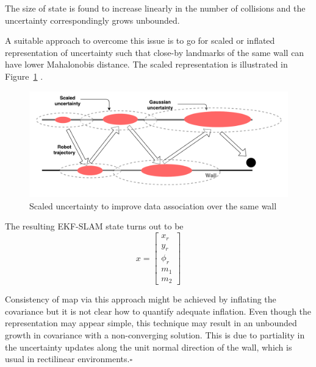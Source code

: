 \begin{exmp}
The size of state is found to increase linearly in the number of collisions and the uncertainty correspondingly grows unbounded. 

A suitable approach to overcome this issue is to go for scaled or inflated representation of uncertainty \cite{julier2003stability} such that close-by landmarks of the same wall can have lower Mahalonobis distance. The scaled representation is illustrated in Figure~\ref{ex1_scalepointlandmark} .
\begin{figure}
\centering
\includegraphics[scale=0.5]{./images/ex1_scalepointlandmark}
\caption[Scaled representation of point landmarks]{Scaled uncertainty to improve data association over the same wall}
\label{ex1_scalepointlandmark}
\end{figure}  

The resulting EKF-SLAM state turns out to be
\begin{equation}
x=\begin{bmatrix}x_r \\ y_r \\ \phi_r \\ m_1 \\ m_2 \end{bmatrix}
\label{eq_state}
\end{equation}

Consistency of map via this approach might be achieved by inflating the covariance \cite{julier2003stability} but it is not clear how to quantify adequate inflation. Even though the representation may appear simple, this technique may result in an unbounded growth in covariance with a non-converging solution. This is due to partiality in the uncertainty updates along the unit normal direction of the wall, which is usual in rectilinear environments.\hfill $\square$
\label{example1}
\end{exmp}

